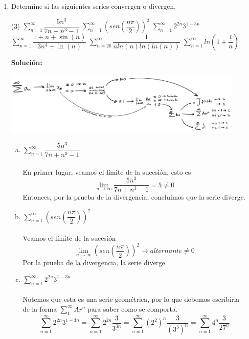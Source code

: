 \documentclass[12pt]{article}
\newenvironment{solucion}
{\begin{mdframed}[backgroundcolor=black!10]
		{\bf Solución:}\\
	}
	{
	\end{mdframed}
}
\newenvironment{preguntas}
{\begin{enumerate}\itemsep12pt
	}
	{
	\end{enumerate}
}
\newcommand{\ra}{\rightarrow}
\begin{document}
\begin{preguntas}
\item Determine si las siguientes series convergen o divergen.
\begin{tasks}(3)
\task $\sum\limits_{n=1}^{\infty}\dfrac{5n^3}{7n+n^3-1}$
\task $\sum\limits_{n=1}^{\infty}\left(sen\left(\dfrac{n\pi}{2}\right)\right)^2$
\task $\sum\limits_{n=1}^{\infty}2^{2n}3^{1-3n}$
\task $\sum\limits_{n=1}^{\infty}\dfrac{1 + n + \sin(n)}{3n^4 + \ln(n)}$
\task $\sum\limits_{n=20}^{\infty}\dfrac{1}{nln(n)ln(ln(n))}$
\task $\sum\limits_{n=1}^{\infty}ln\left(1+\dfrac{1}{n}\right)$
\end{tasks}
\begin{solucion}
\begin{center}
\includegraphics[width=12cm]{../../../../img/mapa_series}
\end{center}
\begin{enumerate}[a)]
\item $\sum\limits_{n=1}^{\infty}\dfrac{5n^3}{7n+n^3-1}$\\
			\\
			En primer lugar, veamos el límite de la sucesión, esto es
			$$\lim\limits_{n\ra \infty} \dfrac{5n^3}{7n+n^3-1} = 5 \neq 0$$
			Entonces, por la prueba de la divergencia, concluimos que la serie diverge.
\item $\sum\limits_{n=1}^{\infty}\left(sen\left(\dfrac{n\pi}{2}\right)\right)^2$\\
			\\
			Veamos el límite de la sucesión
			$$\lim\limits_{n\ra \infty} \left(sen\left(\dfrac{n\pi}{2}\right)\right)^2 \ra alternante \neq 0$$
			Por la prueba de la divergencia, la serie diverge.
\item $\sum\limits_{n=1}^{\infty}2^{2n}3^{1-3n}$\\
			\\
			Notemos que esta es una serie geométrica, por lo que debemos escribirla de la forma $\sum\limits_1^{\infty} Ar^n$ para saber como se comporta.
$$\sum\limits_{n=1}^{\infty}2^{2n}3^{1-3n} 
= \sum\limits_{n=1}^{\infty}2^{2n} \dfrac{3}{3^{3n}}
= \sum\limits_{n=1}^{\infty}(2^2)^n \dfrac{3}{(3^3)^n}
= \sum\limits_{n=1}^{\infty}4^n \dfrac{3}{27^n}
$$
\end{enumerate}
\end{solucion}
\end{preguntas}
\end{document}
